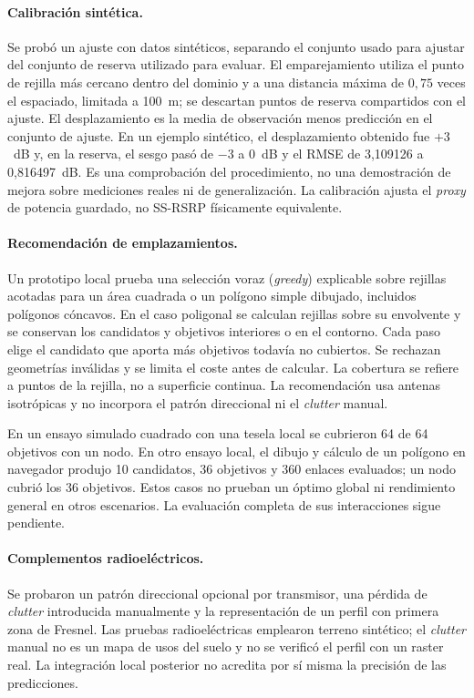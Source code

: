 \paragraph{Calibración sintética.}
Se probó un ajuste con datos sintéticos, separando el conjunto usado para ajustar del
conjunto de reserva utilizado para evaluar. El emparejamiento utiliza el punto de rejilla
más cercano dentro del dominio y a una distancia máxima de $0{,}75$ veces el espaciado,
limitada a 100~m; se descartan puntos de reserva compartidos con el ajuste. El
desplazamiento es la media de observación menos predicción en el conjunto de ajuste.
En un ejemplo sintético, el desplazamiento obtenido fue $+3$~dB y, en la reserva, el
sesgo pasó de $-3$ a $0$~dB y el RMSE de 3,109126 a 0,816497~dB. Es una comprobación
del procedimiento, no una demostración de mejora sobre mediciones reales ni de
generalización. La calibración ajusta el \textit{proxy} de potencia guardado, no SS-RSRP
físicamente equivalente.

\paragraph{Recomendación de emplazamientos.}
Un prototipo local prueba una selección voraz (\textit{greedy}) explicable sobre rejillas
acotadas para un área cuadrada o un polígono simple dibujado, incluidos polígonos
cóncavos. En el caso poligonal se calculan rejillas sobre su envolvente y se conservan
los candidatos y objetivos interiores o en el contorno. Cada paso elige el candidato
que aporta más objetivos todavía no cubiertos. Se rechazan geometrías inválidas y se
limita el coste antes de calcular. La cobertura se refiere a puntos de la rejilla, no a
superficie continua. La recomendación usa antenas isotrópicas y no incorpora el patrón
direccional ni el \textit{clutter} manual.

En un ensayo simulado cuadrado con una tesela local se cubrieron 64 de 64 objetivos
con un nodo. En otro ensayo local, el dibujo y cálculo de un polígono en navegador
produjo 10 candidatos, 36 objetivos y 360 enlaces evaluados; un nodo cubrió los 36
objetivos. Estos casos no prueban un óptimo global ni rendimiento general en otros
escenarios. La evaluación completa de sus interacciones sigue pendiente.

\paragraph{Complementos radioeléctricos.}
Se probaron un patrón direccional opcional por transmisor, una pérdida de
\textit{clutter} introducida manualmente y la representación de un perfil con primera
zona de Fresnel.
Las pruebas radioeléctricas emplearon terreno sintético; el \textit{clutter} manual no
es un mapa de usos del suelo y no se verificó el perfil con un raster real. La
integración local posterior no acredita por sí misma la precisión de las predicciones.

